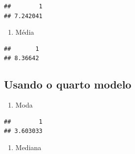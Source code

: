 \documentclass[]{article}
\newenvironment{Shaded}{\begin{snugshade}}{\end{snugshade}}
\newcommand{\KeywordTok}[1]{\textcolor[rgb]{0.13,0.29,0.53}{\textbf{#1}}}
\newcommand{\DataTypeTok}[1]{\textcolor[rgb]{0.13,0.29,0.53}{#1}}
\newcommand{\DecValTok}[1]{\textcolor[rgb]{0.00,0.00,0.81}{#1}}
\newcommand{\StringTok}[1]{\textcolor[rgb]{0.31,0.60,0.02}{#1}}
\newcommand{\OperatorTok}[1]{\textcolor[rgb]{0.81,0.36,0.00}{\textbf{#1}}}
\newcommand{\NormalTok}[1]{#1}
\providecommand{\tightlist}{%
  \setlength{\itemsep}{0pt}\setlength{\parskip}{0pt}}
\begin{document}
\begin{verbatim}
##        1 
## 7.242041
\end{verbatim}

\begin{enumerate}
\def\labelenumi{\alph{enumi}.}
\setcounter{enumi}{2}
\tightlist
\item
  Média
\end{enumerate}

\begin{Shaded}
\end{Shaded}

\begin{verbatim}
##       1 
## 8.36642
\end{verbatim}

\subsection{Usando o quarto modelo}\label{usando-o-quarto-modelo}

\begin{enumerate}
\def\labelenumi{\alph{enumi}.}
\tightlist
\item
  Moda
\end{enumerate}

\begin{Shaded}
\end{Shaded}

\begin{verbatim}
##        1 
## 3.603033
\end{verbatim}

\begin{enumerate}
\def\labelenumi{\alph{enumi}.}
\setcounter{enumi}{1}
\tightlist
\item
  Mediana
\end{enumerate}
\end{document}
